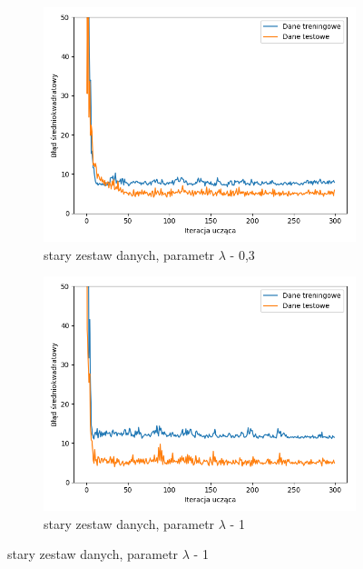 \documentclass[12pt]{aghdpl}
\begin{document}
		\begin{figure}[h]
			\begin{subfigure}{.5\linewidth}
		 		\includegraphics[width =\linewidth]{wykresy/8_zebranie_wiekszej_ilosci_danych/0-200/regularyzacja_0_3_wykres_uczenia.png}
		 		\caption{stary zestaw danych, parametr $\lambda$ - 0,3}
		 	\end{subfigure}
		 	\begin{subfigure}{.5\linewidth}
		 		\includegraphics[width =\linewidth]{wykresy/8_zebranie_wiekszej_ilosci_danych/0-200/regularyzacja_1_wykres_uczenia.png}
		 		\caption{stary zestaw danych, parametr $\lambda$ - 1}
		 	\end{subfigure}
		

\end{figure}
\end{document}

